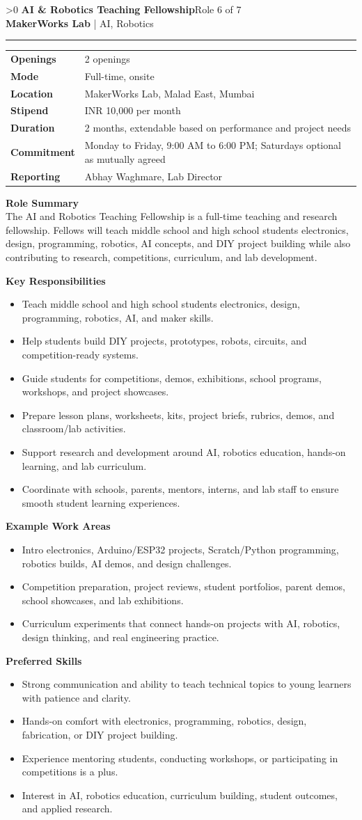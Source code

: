 \documentclass[10pt,a4paper]{article}
\newcommand{\CommonLocation}{MakerWorks Lab, Malad East, Mumbai}
\newcommand{\CommonStipend}{INR 10,000 per month}
\newcommand{\CommonDuration}{2 months, extendable based on performance and project needs}
\newcommand{\CommonCommitment}{Monday to Friday, 9:00 AM to 6:00 PM; Saturdays optional as mutually agreed}
\newcommand{\CommonReporting}{Abhay Waghmare, Lab Director}
\newcounter{rolepage}
\newcommand{\RolePage}[3]{%
  \ifnum\value{rolepage}>0\clearpage\fi
  \stepcounter{rolepage}
  \thispagestyle{plain}
  {\Large\textbf{#1}}\hfill{\small #2}\\
  {\small\textbf{MakerWorks Lab} | AI, Robotics}\\[4pt]
  \hrule
  \vspace{6pt}
  #3
}
\newcommand{\DetailsTable}[3]{%
\begin{tabularx}{\linewidth}{>{\bfseries}p{30mm}X}
Openings & #3 \\
Mode & #1 \\
Location & #2 \\
Stipend & \CommonStipend \\
Duration & \CommonDuration \\
Commitment & \CommonCommitment \\
Reporting & \CommonReporting \\
\end{tabularx}
}
\newcommand{\RoleSection}[1]{\vspace{5pt}\par\noindent\textbf{#1}\par\vspace{2pt}}
\begin{document}
\RolePage{AI \& Robotics Teaching Fellowship}{Role 6 of 7}{
\DetailsTable{Full-time, onsite}{\CommonLocation}{2 openings}

\textbf{Role Summary}\\
The AI and Robotics Teaching Fellowship is a full-time teaching and research fellowship. Fellows will teach middle school and high school students electronics, design, programming, robotics, AI concepts, and DIY project building while also contributing to research, competitions, curriculum, and lab development.

\RoleSection{Key Responsibilities}
\begin{itemize}
  \item Teach middle school and high school students electronics, design, programming, robotics, AI, and maker skills.
  \item Help students build DIY projects, prototypes, robots, circuits, and competition-ready systems.
  \item Guide students for competitions, demos, exhibitions, school programs, workshops, and project showcases.
  \item Prepare lesson plans, worksheets, kits, project briefs, rubrics, demos, and classroom/lab activities.
  \item Support research and development around AI, robotics education, hands-on learning, and lab curriculum.
  \item Coordinate with schools, parents, mentors, interns, and lab staff to ensure smooth student learning experiences.
\end{itemize}

\RoleSection{Example Work Areas}
\begin{itemize}
  \item Intro electronics, Arduino/ESP32 projects, Scratch/Python programming, robotics builds, AI demos, and design challenges.
  \item Competition preparation, project reviews, student portfolios, parent demos, school showcases, and lab exhibitions.
  \item Curriculum experiments that connect hands-on projects with AI, robotics, design thinking, and real engineering practice.
\end{itemize}

\RoleSection{Preferred Skills}
\begin{itemize}
  \item Strong communication and ability to teach technical topics to young learners with patience and clarity.
  \item Hands-on comfort with electronics, programming, robotics, design, fabrication, or DIY project building.
  \item Experience mentoring students, conducting workshops, or participating in competitions is a plus.
  \item Interest in AI, robotics education, curriculum building, student outcomes, and applied research.
\end{itemize}

}
\end{document}
